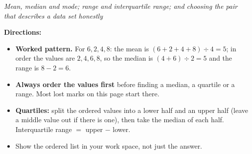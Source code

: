 \documentclass[12pt]{article}
\begin{document}

\begin{center}
\textit{Mean, median and mode; range and interquartile range; and choosing the
pair that describes a data set honestly}
\end{center}

\noindent\textbf{Directions:}
\begin{itemize}
  \item \textbf{Worked pattern.} For $6, 2, 4, 8$: the mean is
        $(6 + 2 + 4 + 8) \div 4 = 5$; in order the values are $2, 4, 6, 8$, so
        the median is $(4 + 6) \div 2 = 5$ and the range is $8 - 2 = 6$.
  \item \textbf{Always order the values first} before finding a median, a
        quartile or a range. Most lost marks on this page start there.
  \item \textbf{Quartiles:} split the ordered values into a lower half and an
        upper half (leave a middle value out if there is one), then take the
        median of each half. Interquartile range $=$ upper $-$ lower.
  \item Show the ordered list in your work space, not just the answer.
\end{itemize}





\end{document}
